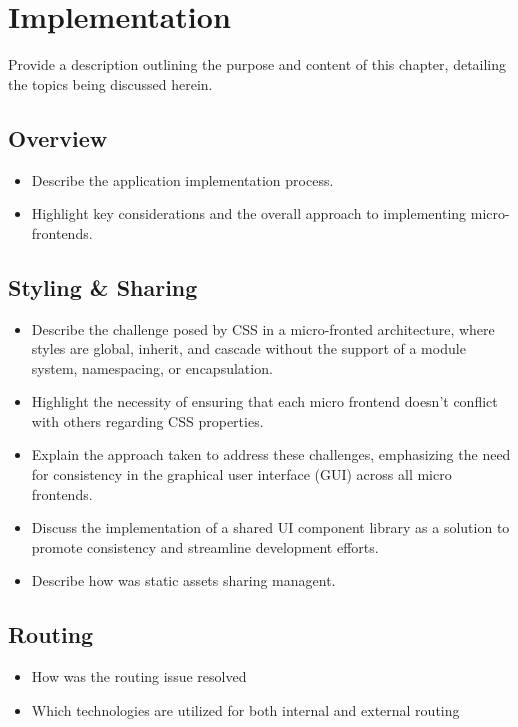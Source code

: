 \chapter{Implementation}
\label{chap:Implementation}
Provide a description outlining the purpose and content of this chapter, detailing the topics being discussed herein.

\section{Overview}
\begin{itemize}
   \item Describe the application implementation process.
   \item Highlight key considerations and the overall approach to implementing micro-frontends.
\end{itemize}

\section{Styling \& Sharing}
\begin{itemize}
   \item Describe the challenge posed by CSS in a micro-fronted architecture, where styles are global, inherit, and cascade without the support of a module system, namespacing, or encapsulation.
   \item Highlight the necessity of ensuring that each micro frontend doesn't conflict with others regarding CSS properties.
   \item Explain the approach taken to address these challenges, emphasizing the need for consistency in the graphical user interface (GUI) across all micro frontends.
   \item Discuss the implementation of a shared UI component library as a solution to promote consistency and streamline development efforts.
   \item Describe how was static assets sharing managent.
\end{itemize}

\section{Routing}
\begin{itemize}
   \item How was the routing issue resolved
   \item Which technologies are utilized for both internal and external routing
\end{itemize}

